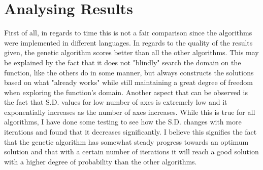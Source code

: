 \documentclass{report}
\begin{document}
\pagebreak

\section*{Analysing Results}
First of all, in regards to time this is not a fair comparison since the algorithms were implemented in different languages. 
\newline
\newline
In regards to the quality of the results given, the genetic algorithm scores better than all the other algorithms. This may be explained by the fact that it does 
not "blindly" search the domain on the function, like the others do in some manner, but always constructs the solutions based on what "already works" while still maintaining a great degree of freedom when exploring the function's domain.
\newline
\newline
Another aspect that can be observed is the fact that S.D. values for low number of axes is extremely low and it exponentially increases as the number of axes increases. While this is true for all algorithms, I have done some testing to see how the S.D. changes with more iterations
and found that it decreases significantly. 
\newline
\newline
I believe this signifies the fact that the genetic algorithm has somewhat steady progress towards an optimum solution and that with a certain number of iterations it will reach a good solution with a higher degree of probability than the other algorithms.
\end{document}
